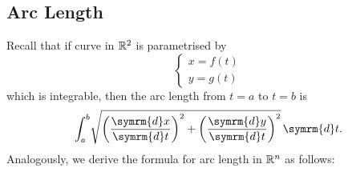 \documentclass[math]{amznotes}
\theoremstyle{remark}
\begin{document}
\subsection{Arc Length}
Recall that if curve in $\mathbb{R}^2$ is parametrised by
\begin{displaymath}
    \begin{cases}
        x = f(t) \\
        y = g(t)
    \end{cases}
\end{displaymath}
which is integrable, then the arc length from $t = a$ to $t = b$ is
\begin{displaymath}
    \int_a^b \!\sqrt{\left(\frac{\symrm{d}x}{\symrm{d}t}\right)^2 + \left(\frac{\symrm{d}y}{\symrm{d}t}\right)^2} \,\symrm{d}t.
\end{displaymath}
Analogously, we derive the formula for arc length in $\mathbb{R}^n$ as follows:
\end{document}
